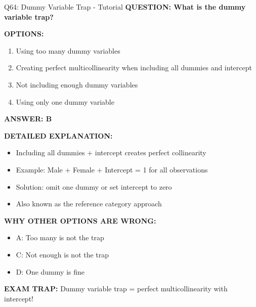 \documentclass[8pt]{beamer}
\begin{document}
	\begin{frame}{Q64: Dummy Variable Trap - Tutorial}
		\fontsize{6.5}{7.5}\selectfont
		\textbf{QUESTION: What is the dummy variable trap?}
		
		\vspace{0.1cm}
		\textbf{OPTIONS:}
		\begin{enumerate}
			\item Using too many dummy variables
			\item Creating perfect multicollinearity when including all dummies and intercept
			\item Not including enough dummy variables
			\item Using only one dummy variable
		\end{enumerate}
		
		\vspace{0.1cm}
		\textcolor{myblue}{\textbf{ANSWER: B}}
		
		\vspace{0.1cm}
		\textbf{DETAILED EXPLANATION:}
		\begin{itemize}
			\item Including all dummies + intercept creates perfect collinearity
			\item Example: Male + Female + Intercept = 1 for all observations
			\item Solution: omit one dummy or set intercept to zero
			\item Also known as the reference category approach
		\end{itemize}
		
		\vspace{0.1cm}
		\textcolor{myred}{\textbf{WHY OTHER OPTIONS ARE WRONG:}}
		\begin{itemize}
			\item \textcolor{myred}{A:} Too many is not the trap
			\item \textcolor{myred}{C:} Not enough is not the trap
			\item \textcolor{myred}{D:} One dummy is fine
		\end{itemize}
		
		\textcolor{myred}{\textbf{EXAM TRAP:}} Dummy variable trap = \textcolor{myblue}{perfect multicollinearity with intercept}!
	\end{frame}
	
\end{document}
